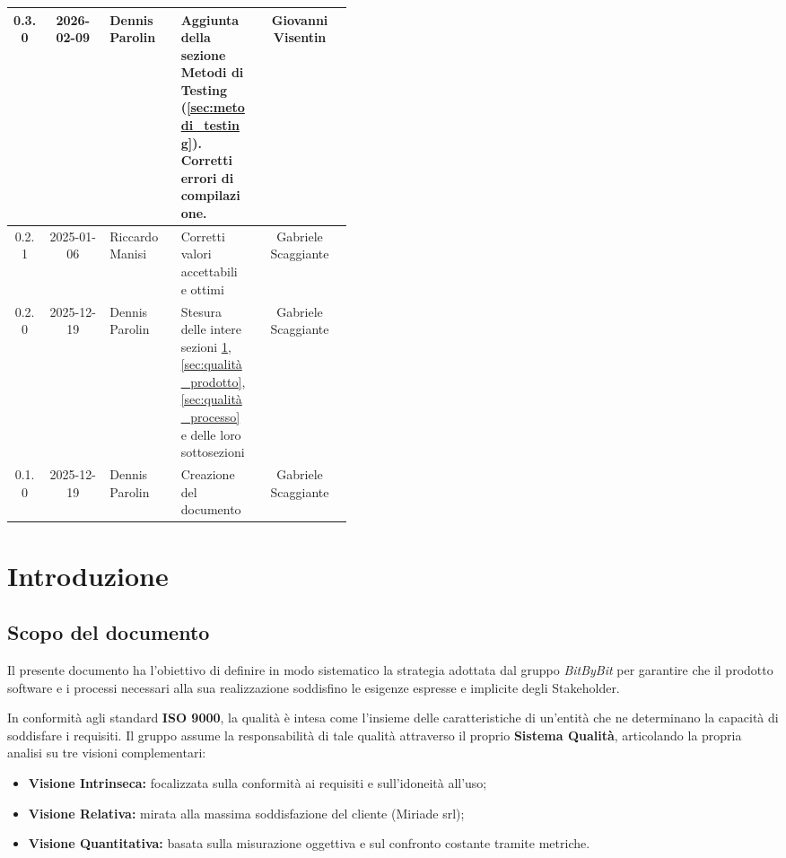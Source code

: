 \documentclass[a4paper,12pt]{article}
\begin{document}
\begin{longtable}{|c|c|L{0.21\linewidth}|L{0.23\linewidth}|c|}
\hline
{}
0.3.0 & 2026-02-09 & Dennis Parolin & Aggiunta della sezione Metodi di Testing (\ref{sec:metodi_testing}). Corretti errori di compilazione. &  Giovanni Visentin \\
\hline
{}
0.2.1 & 2025-01-06 & Riccardo Manisi & Corretti valori accettabili e ottimi & Gabriele Scaggiante\\
\hline
{}
0.2.0 & 2025-12-19 & Dennis Parolin & Stesura delle intere sezioni \ref{sec:introduzione}, \ref{sec:qualità_prodotto}, \ref{sec:qualità_processo} e delle loro sottosezioni &  Gabriele Scaggiante \\
\hline
{}
0.1.0 & 2025-12-19 & Dennis Parolin & Creazione del documento &  Gabriele Scaggiante\\
\hline
\end{longtable}

\clearpage

\tableofcontents
\listoftables
\listoffigures
\thispagestyle{empty}

\clearpage


\section{Introduzione} \label{sec:introduzione}
\subsection{Scopo del documento} \label{sec:scopo_documento}
Il presente documento ha l'obiettivo di definire in modo sistematico la strategia adottata dal gruppo \textit{BitByBit} per garantire che il prodotto software e i processi necessari alla sua realizzazione soddisfino le esigenze espresse e implicite degli Stakeholder.

In conformità agli standard \textbf{ISO 9000}, la qualità è intesa come l'insieme delle caratteristiche di un'entità che ne determinano la capacità di soddisfare i requisiti. Il gruppo assume la responsabilità di tale qualità attraverso il proprio \textbf{Sistema Qualità}, articolando la propria analisi su tre visioni complementari:
\begin{itemize}
    \item \textbf{Visione Intrinseca:} focalizzata sulla conformità ai requisiti e sull'idoneità all'uso;
    \item \textbf{Visione Relativa:} mirata alla massima soddisfazione del cliente (Miriade srl);
    \item \textbf{Visione Quantitativa:} basata sulla misurazione oggettiva e sul confronto costante tramite metriche.
\end{itemize}
\end{document}
